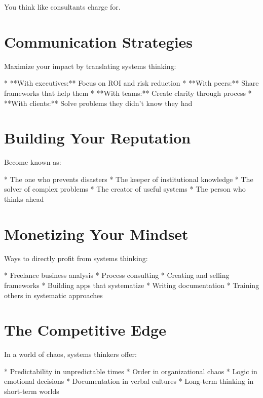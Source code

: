 \documentclass[12pt,oneside]{book}
\begin{document}
You think like consultants charge for.

\section{Communication Strategies}

Maximize your impact by translating systems thinking:

                    * **With executives:** Focus on ROI and risk reduction
                    * **With peers:** Share frameworks that help them
                    * **With teams:** Create clarity through process
                    * **With clients:** Solve problems they didn't know they had

\section{Building Your Reputation}

Become known as:

                    * The one who prevents disasters
                    * The keeper of institutional knowledge
                    * The solver of complex problems
                    * The creator of useful systems
                    * The person who thinks ahead

\section{Monetizing Your Mindset}

Ways to directly profit from systems thinking:

                    * Freelance business analysis
                    * Process consulting
                    * Creating and selling frameworks
                    * Building apps that systematize
                    * Writing documentation
                    * Training others in systematic approaches

\section{The Competitive Edge}

In a world of chaos, systems thinkers offer:

                    * Predictability in unpredictable times
                    * Order in organizational chaos
                    * Logic in emotional decisions
                    * Documentation in verbal cultures
                    * Long-term thinking in short-term worlds
\end{document}
